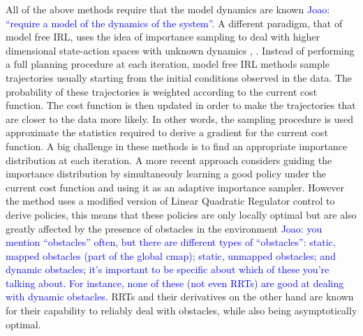 \documentclass{article}  %
\newcommand{\jm}[1]{\textcolor{blue}{Joao: #1}}
\newcommand{\ks}[1]{\textcolor{green}{KS: #1}}
\begin{document}
 All of the above methods require that the model dynamics are known \jm{``require a model of the dynamics of the system''}. A different paradigm, that of model free IRL, uses the idea of importance sampling to deal with higher dimensional state-action spaces with unknown dynamics \cite{boularias2011relative}, \cite{kalakrishnan2013learning}. Instead of performing a full planning procedure at each iteration, model free IRL methods sample trajectories usually starting from the initial conditions observed in the data. The probability of these trajectories is weighted according to the current cost function. The cost function is then updated in order to make the trajectories that are closer to the data more likely. In other words, the sampling procedure is used approximate the statistics required to derive a gradient for the current cost function.  A big challenge in these methods is to find an appropriate importance distribution at each iteration. A more recent approach \cite{finn2016guided} considers guiding the importance distribution by simultaneouly learning a good policy under the current cost function and using it as an adaptive importance sampler. However the method uses a modified version of Linear Quadratic Regulator control to derive policies, this means that these policies are only locally optimal but are also greatly affected by the presence of obstacles in the environment \jm{you mention ``obstacles'' often, but there are different types of ``obstacles'': static, mapped obstacles (part of the global cmap); static, unmapped obstacles; and dynamic obstacles; it's important to be specific about which of these you're talking about. For instance, none of these (not even RRTs) are good at dealing with dynamic obstacles}. RRTs and their derivatives on the other hand are known for their capability to reliably deal with obstacles, while also being asymptotically optimal.







\end{document}
